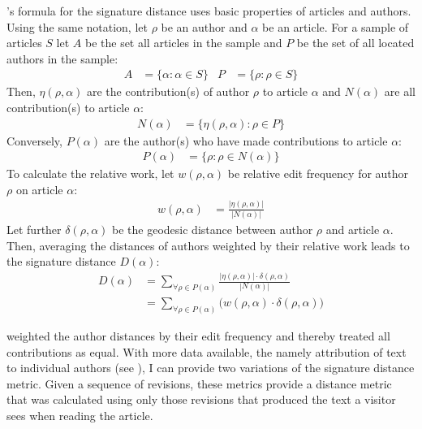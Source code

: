 \citeauthor{hardy2011volunteered} 's formula for the signature distance uses basic properties of articles and authors.
Using the same notation, let $\rho$ be an author and $\alpha$ be an article.
For a sample of articles $S$ let $A$ be the set all articles in the sample and $P$ be the set of all located authors in the sample:
\begin{align*}
A &= \{\alpha : \alpha \in S\} &P &= \{\rho : \rho \in S\}
\end{align*}
Then, $\eta(\rho,\alpha)$ are the contribution(s) of author $\rho$ to article $\alpha$ and $N(\alpha)$ are all contribution(s) to article $\alpha$:
\begin{align*}
N(\alpha) &= \{\eta(\rho,\alpha) : \rho \in P\}
\end{align*}
Conversely, $P(\alpha)$ are the author(s) who have made contributions to article $\alpha$:
\begin{align*}
P(\alpha) &= \{\rho : \rho \in N(\alpha)\}
\end{align*}
To calculate the relative work, let $w(\rho,\alpha)$ be relative edit frequency for author $\rho$ on article $\alpha$:
\begin{align*}
w(\rho,\alpha) &= \frac{|\eta(\rho,\alpha)|}{|N(\alpha)|}
\end{align*}
Let further $\delta(\rho,\alpha)$ be the geodesic distance between author $\rho$ and article $\alpha$.
Then, averaging the distances of authors weighted by their relative work leads to the signature distance $D(\alpha)$:
\begin{equation}\label{eqn:sigdist}
\begin{split}
D(\alpha) &= \sum_{\forall \rho \in P(\alpha)} \frac{|\eta(\rho,\alpha)| \cdot \delta(\rho,\alpha)}{|N(\alpha)|} \\
 &=  \sum_{\forall \rho \in P(\alpha)} \big(w(\rho,\alpha) \cdot \delta(\rho,\alpha)\big)
 \end{split}
\end{equation}

\citeauthor{hardy2011volunteered} weighted the author distances by their edit frequency and thereby treated all contributions as equal.
With more data available, the namely attribution of text to individual authors (see ), I can provide two variations of the signature distance metric.
Given a sequence of revisions, these metrics provide a distance metric that was calculated using only those revisions that produced the text a visitor sees when reading the article.

